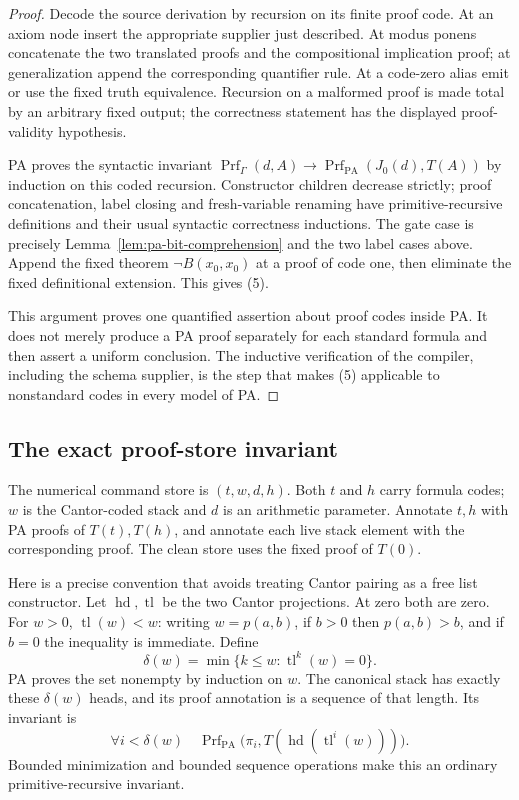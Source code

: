 \begin{proof}
Decode the source derivation by recursion on its finite proof code.
At an axiom node insert the appropriate supplier just described.
At modus ponens concatenate the two translated proofs and the
compositional implication proof; at generalization append the
corresponding quantifier rule. At a code-zero alias emit or use the
fixed truth equivalence. Recursion on a malformed proof is made total
by an arbitrary fixed output; the correctness statement has the
displayed proof-validity hypothesis.

PA proves the syntactic invariant
$\operatorname{Prf}_{\Gamma}(d,A)\to
  \operatorname{Prf}_{\mathrm{PA}}(J_0(d),T(A))$
by induction on this coded recursion. Constructor children decrease
strictly; proof concatenation, label closing and fresh-variable
renaming have primitive-recursive definitions and their usual
syntactic correctness inductions. The gate case is precisely
Lemma~\ref{lem:pa-bit-comprehension} and the two label cases above.
Append the fixed theorem $\neg B(x_0,x_0)$ at a proof of code one,
then eliminate the fixed definitional extension. This gives (5).

This argument proves one quantified assertion about proof codes
inside PA. It does not merely produce a PA proof separately for each
standard formula and then assert a uniform conclusion. The inductive
verification of the compiler, including the schema supplier, is the
step that makes (5) applicable to nonstandard codes in every model
of PA.
\end{proof}

\subsection{The exact proof-store invariant}

The numerical command store is $(t,w,d,h)$. Both $t$ and $h$ carry
formula codes; $w$ is the Cantor-coded stack and $d$ is an arithmetic
parameter. Annotate $t,h$ with PA proofs of $T(t),T(h)$, and annotate
each live stack element with the corresponding proof. The clean store
uses the fixed proof of $T(0)$.

Here is a precise convention that avoids treating Cantor pairing as a
free list constructor. Let $\operatorname{hd},\operatorname{tl}$ be
the two Cantor projections. At zero both are zero. For $w>0$,
$\operatorname{tl}(w)<w$: writing $w=p(a,b)$, if $b>0$ then
$p(a,b)>b$, and if $b=0$ the inequality is immediate. Define
\[
 \delta(w)=\min\{k\le w:\operatorname{tl}^{k}(w)=0\}.
\]
PA proves the set nonempty by induction on $w$.
The canonical stack has exactly these $\delta(w)$ heads, and its
proof annotation is a sequence of that length. Its invariant is
\[
 \forall i<\delta(w)\quad
 \operatorname{Prf}_{\mathrm{PA}}
 \bigl(\pi_i,T(\operatorname{hd}(\operatorname{tl}^{i}(w)))\bigr).
                                                        \tag{6}
\]
Bounded minimization and bounded sequence operations make this an
ordinary primitive-recursive invariant.

